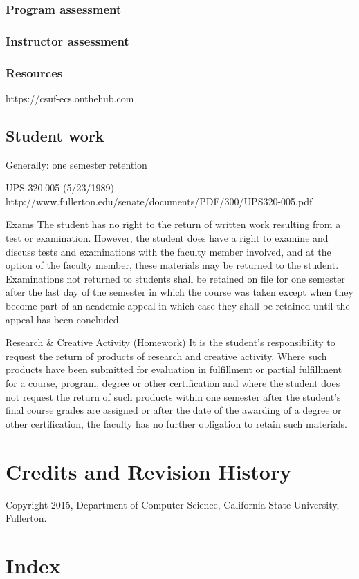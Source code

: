 \documentclass{book}
\begin{document}
\subsection{Program assessment}
\subsection{Instructor assessment}

\subsection{Resources}
https://csuf-ecs.onthehub.com

\section{Student work}
Generally: one semester retention

UPS 320.005 (5/23/1989)
http://www.fullerton.edu/senate/documents/PDF/300/UPS320-005.pdf

Exams
The student has no right to the return of written work resulting from a test or examination. However, the student does have a right to examine and discuss tests and examinations with the faculty member involved, and at the option of the faculty member, these materials may be returned to the student. Examinations not returned to students shall be retained on file for one semester after the last day of the semester in which the course was taken except when they become part of an academic appeal in which case they shall be retained until the appeal has been concluded.

Research & Creative Activity (Homework)
It is the student's responsibility to request the return of products of research and creative activity. Where such products have been submitted for evaluation in fulfillment or partial fulfillment for a course, program, degree or other certification and where the student does not request the return of such products within one semester after the student's final course grades are assigned or after the date of the awarding of a degree or other certification, the faculty has no further obligation to retain such materials.

\chapter{Credits and Revision History}

Copyright 2015, Department of Computer Science, California State University, Fullerton.

\chapter{Index}
\printindex
\end{document}
